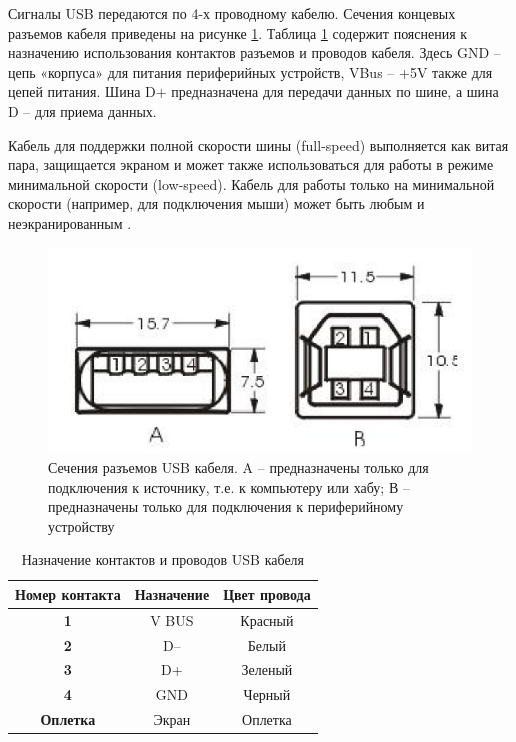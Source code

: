 Сигналы USB передаются по 4-х проводному кабелю. Сечения концевых разъемов кабеля приведены на рисунке \ref{fig:usb_connector}. Таблица \ref{tab:usb_signals} содержит пояснения к назначению использования контактов разъемов и проводов кабеля. Здесь GND – цепь «корпуса» для питания периферийных устройств, VBus – +5V также для цепей питания. Шина D+ предназначена для передачи данных по шине, а шина D – для приема данных.

Кабель для поддержки полной скорости шины (full-speed) выполняется как витая пара, защищается экраном и может также использоваться для работы в режиме минимальной скорости (low-speed). Кабель для работы только на минимальной скорости (например, для подключения мыши) может быть любым и неэкранированным \cite{usb:analyse}.

\pagebreak

\begin{figure}[ht!]
    \centering
    \includegraphics[scale=0.5]{res/img/usb_connector.png}
    \caption{Сечения разъемов USB кабеля. A – предназначены только для подключения к источнику, т.е. к компьютеру или хабу; В – предназначены только для подключения к периферийному устройству \cite{usb:specification}}
    \label{fig:usb_connector}
\end{figure}

\begin{table}[ht!]
  \caption{Назначение контактов и проводов USB кабеля \cite{usb:specification}}
    \centering
    \begin{tabular}{|c|c|c|}
    \hline
        \textbf{Номер контакта} & \textbf{Назначение} & \textbf{Цвет провода} \\ \hline
        \textbf{1} & V BUS & Красный \\ \hline
        \textbf{2} & D– & Белый \\ \hline
        \textbf{3} & D+ & Зеленый \\ \hline
        \textbf{4} & GND & Черный \\ \hline
        \textbf{Оплетка} & Экран & Оплетка \\ \hline
  \end{tabular}
  \label{tab:usb_signals}
\end{table}

